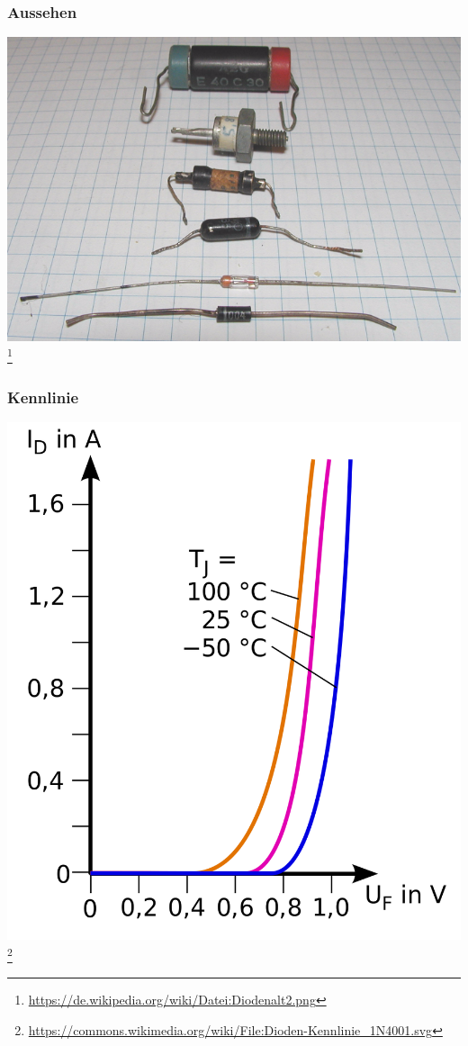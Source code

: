 \begin{frame}
    \frametitle{Aussehen}
    \begin{center}
        \includegraphics[width=.8\textwidth]{e12/Diodenalt2.png}
        \footnote{\tiny \url{https://de.wikipedia.org/wiki/Datei:Diodenalt2.png}}
	\end{center}
\end{frame}

\begin{frame}
    \frametitle{Kennlinie}
    \begin{center}
        \includegraphics[width=.65\textwidth]{e12/Kennlinie_1N4001.png}
        \footnote{\tiny \url{https://commons.wikimedia.org/wiki/File:Dioden-Kennlinie_1N4001.svg}}
	\end{center}
\end{frame}

